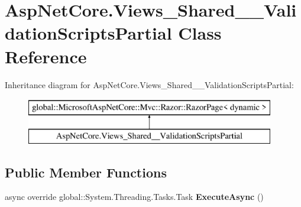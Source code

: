 \hypertarget{class_asp_net_core_1_1_views___shared_____validation_scripts_partial}{}\section{Asp\+Net\+Core.\+Views\+\_\+\+Shared\+\_\+\+\_\+\+Validation\+Scripts\+Partial Class Reference}
\label{class_asp_net_core_1_1_views___shared_____validation_scripts_partial}
Inheritance diagram for Asp\+Net\+Core.\+Views\+\_\+\+Shared\+\_\+\+\_\+\+Validation\+Scripts\+Partial\+:\begin{figure}[H]
\begin{center}
\leavevmode
\includegraphics[height=2.000000cm]{class_asp_net_core_1_1_views___shared_____validation_scripts_partial}
\end{center}
\end{figure}
\subsection*{Public Member Functions}
\begin{DoxyCompactItemize}
\item 
\mbox{\label{class_asp_net_core_1_1_views___shared_____validation_scripts_partial_aca45bee43cd2ddef240d2b1f1f2385c9}} 
async override global\+::\+System.\+Threading.\+Tasks.\+Task {\bfseries Execute\+Async} ()
\end{DoxyCompactItemize}
